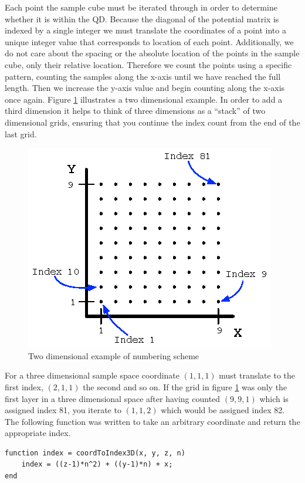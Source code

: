 \documentclass[authoryearcitations]{UoYCSproject}
\begin{document}
Each point the sample cube must be iterated through in order to determine whether it is within the QD. 
Because the diagonal of the potential matrix is indexed by a single integer we must translate the 
coordinates of a point into a unique integer value 
that corresponds to location of each point. Additionally, we do not care about the spacing or the absolute location
of the points in
the sample cube, only their relative location. Therefore we count the points using a specific pattern, counting
the samples along the x-axis until we have reached the full length. Then we increase the y-axis value and
begin counting along the x-axis once again. Figure \ref{indexNum} illustrates a two dimensional example. 
In order to add a third dimension it helps to think of three dimensions as a ``stack'' of  two dimensional grids,
ensuring that you continue the index count from the end of the last grid.

\begin{figure}[h!]
  \centering
  \includegraphics[scale=1.5]{figures/indexNumbering.eps}
  \caption{Two dimensional example of numbering scheme}
\label{indexNum}
\end{figure}

For a three dimensional sample space coordinate $(1,1,1)$ must translate to the first index, 
$(2,1,1)$ the second and so on. If the grid in figure \ref{indexNum} was only the first layer in a three dimensional 
space after having counted $(9,9,1)$ which is assigned index 81, you iterate to $(1,1,2)$ which would be assigned index 82.
The following function was written to take an arbitrary coordinate and return the appropriate index.
 
\begin{lstlisting}[caption={Index value from sample point},
label=lst:coordToIndex]
function index = coordToIndex3D(x, y, z, n)
    index = ((z-1)*n^2) + ((y-1)*n) + x;
end
\end{lstlisting}
\end{document}
